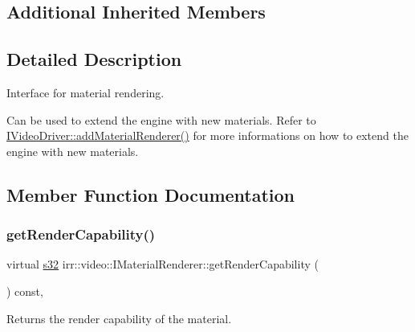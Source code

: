 \subsection*{Additional Inherited Members}


\subsection{Detailed Description}
Interface for material rendering. 

Can be used to extend the engine with new materials. Refer to \hyperlink{classirr_1_1video_1_1IVideoDriver_a0dfc3a7168f3a73a6f4323b579f03ff6}{I\+Video\+Driver\+::add\+Material\+Renderer()} for more informations on how to extend the engine with new materials. 

\subsection{Member Function Documentation}
\mbox{\label{classirr_1_1video_1_1IMaterialRenderer_a5ca13576cb3f466cf2cd9427926121fa}} 
\subsubsection{\texorpdfstring{get\+Render\+Capability()}{getRenderCapability()}}
{\footnotesize\ttfamily virtual \hyperlink{namespaceirr_ac66849b7a6ed16e30ebede579f9b47c6}{s32} irr\+::video\+::\+I\+Material\+Renderer\+::get\+Render\+Capability (\begin{DoxyParamCaption}{ }\end{DoxyParamCaption}) const\hspace{0.3cm}{\ttfamily [inline]}, {\ttfamily [virtual]}}



Returns the render capability of the material. 

